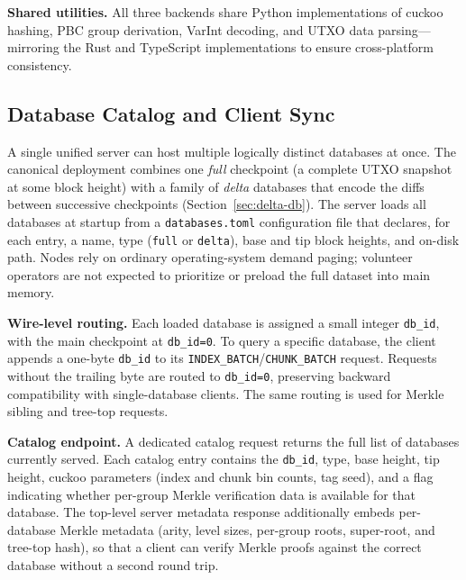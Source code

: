 \textbf{Shared utilities.} All three backends share Python implementations of cuckoo hashing, PBC group derivation, VarInt decoding, and UTXO data parsing---mirroring the Rust and TypeScript implementations to ensure cross-platform consistency.

\subsection{Database Catalog and Client Sync}
\label{sec:deployment-catalog}

A single unified server can host multiple logically distinct databases at once. The canonical deployment combines one \emph{full} checkpoint (a complete UTXO snapshot at some block height) with a family of \emph{delta} databases that encode the diffs between successive checkpoints (Section~\ref{sec:delta-db}). The server loads all databases at startup from a \texttt{databases.toml} configuration file that declares, for each entry, a name, type (\texttt{full} or \texttt{delta}), base and tip block heights, and on-disk path. Nodes rely on ordinary operating-system demand paging; volunteer operators are not expected to prioritize or preload the full dataset into main memory.

\textbf{Wire-level routing.} Each loaded database is assigned a small integer \texttt{db\_id}, with the main checkpoint at \texttt{db\_id=0}. To query a specific database, the client appends a one-byte \texttt{db\_id} to its \texttt{INDEX\_BATCH}/\texttt{CHUNK\_BATCH} request. Requests without the trailing byte are routed to \texttt{db\_id=0}, preserving backward compatibility with single-database clients. The same routing is used for Merkle sibling and tree-top requests.

\textbf{Catalog endpoint.} A dedicated catalog request returns the full list of databases currently served. Each catalog entry contains the \texttt{db\_id}, type, base height, tip height, cuckoo parameters (index and chunk bin counts, tag seed), and a flag indicating whether per-group Merkle verification data is available for that database. The top-level server metadata response additionally embeds per-database Merkle metadata (arity, level sizes, per-group roots, super-root, and tree-top hash), so that a client can verify Merkle proofs against the correct database without a second round trip.

